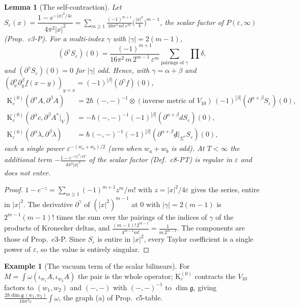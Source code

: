 \documentclass[11pt]{article}
\numberwithin{equation}{section}
\theoremstyle{plain}
\newtheorem{lemma}[theorem]{Lemma}
\theoremstyle{definition}
\newtheorem{example}[theorem]{Example}
\begin{document}
\begin{lemma}[The self-contraction]
\label{lem:tl-k0}
Let $S_\varepsilon(x)=\dfrac{1-e^{-|x|^2/4\varepsilon}}{4\pi^2|x|^2}=\displaystyle\sum_{m\ge1}\frac{(-1)^{m+1}}{16\pi^2\,m!\,\varepsilon^m}\Big(\frac{|x|^2}4\Big)^{m-1}$, the scalar factor of $P(\varepsilon,\infty)$ (Prop.~c3-P). For a multi-index $\gamma$ with $|\gamma|=2(m-1)$,
\[
(\partial^\gamma S_\varepsilon)(0)=\frac{(-1)^{m+1}}{16\pi^2\,m\,2^{m-1}\,\varepsilon^m}\sum_{\text{pairings of }\gamma}\prod\delta ,
\]
and $(\partial^\gamma S_\varepsilon)(0)=0$ for $|\gamma|$ odd. Hence, with $\gamma=\alpha+\beta$ and $(\partial^\alpha_x\partial^\beta_yf(x-y))_{y=x}=(-1)^{|\beta|}(\partial^\gamma f)(0)$,
\[
\begin{aligned}
\mathrm K^{(0)}_\varepsilon(\partial^\alpha A,\partial^\beta A)&=2\hbar\,(-,-)^{-1}\otimes(\text{inverse metric of }V_{10})\,(-1)^{|\beta|}(\partial^{\alpha+\beta}S_\varepsilon)(0),\\
\mathrm K^{(0)}_\varepsilon(\partial^\alpha c,\partial^\beta A^*|_V)&=-\hbar(-,-)^{-1}(-1)^{|\beta|}(\partial^{\alpha+\beta}dS_\varepsilon)(0),\\
\mathrm K^{(0)}_\varepsilon(\partial^\alpha\lambda,\partial^\beta\lambda)&=\hbar(-,-)^{-1}(-1)^{|\beta|}(\partial^{\alpha+\beta}{\not d}|_{\Sigma^*}S_\varepsilon)(0),
\end{aligned}
\]
each a single power $\varepsilon^{-(w_a+w_b)/2}$ (zero when $w_a+w_b$ is odd). At $T<\infty$ the additional term $-\frac{1-e^{-|x|^2/4T}}{4\pi^2|x|^2}$ of the scalar factor (Def.~c8-PT) is regular in $\varepsilon$ and does not enter.
\end{lemma}

\begin{proof}
$1-e^{-z}=\sum_{m\ge1}(-1)^{m+1}z^m/m!$ with $z=|x|^2/4\varepsilon$ gives the series, entire in $|x|^2$. The derivative $\partial^\gamma$ of $(|x|^2)^{m-1}$ at $0$ with $|\gamma|=2(m-1)$ is $2^{m-1}(m-1)!$ times the sum over the pairings of the indices of $\gamma$ of the products of Kronecker deltas, and $\frac{(m-1)!\,2^{m-1}}{4^{m-1}m!}=\frac1{m\,2^{m-1}}$. The components are those of Prop.~c3-P. Since $S_\varepsilon$ is entire in $|x|^2$, every Taylor coefficient is a single power of $\varepsilon$, so the value is entirely singular.
\end{proof}

\begin{example}[The vacuum term of the scalar bilinears]
For $M=\int\omega(\iota_{w_1}A,\iota_{w_2}A)$ the pair is the whole operator; $\mathrm K^{(0)}_\varepsilon$ contracts the $V_{10}$ factors to $(w_1,w_2)$ and $(-,-)$ with $(-,-)^{-1}$ to $\dim\mathfrak g$, giving $\frac{2\hbar\dim\mathfrak g\,(w_1,w_2)}{16\pi^2\varepsilon}\int\omega$, the graph (a) of Prop.~c5-table.
\end{example}
\end{document}
